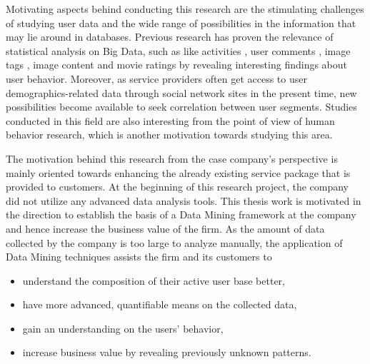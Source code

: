    Motivating aspects behind conducting this research are the stimulating challenges of studying user data and the wide range of possibilities in the information that may lie around in databases. Previous research has proven the relevance of statistical analysis on Big Data, such as like activities \cite{jang2015noreciprocity, jang2016teensengagemorewithfewerphotos, ottoni2013ladies, guy2016whatsyourorganizationlike, jang2015no, youyou2015computer}, user comments \cite{jang2016teensengagemorewithfewerphotos}, image tags \cite{jang2016teensengagemorewithfewerphotos}, image content \cite{hu2014we, bakhshi2014faces} and movie ratings \cite{saraee2004data, kabinsingha2012movie} by revealing interesting findings about user behavior. Moreover, as service providers often get access to user demographics-related data through social network sites in the present time, new possibilities become available to seek correlation between user segments. Studies conducted in this field are also interesting from the point of view of human behavior research, which is another motivation towards studying this area. 

    The motivation behind this research from the case company's perspective is mainly oriented towards enhancing the already existing service package that is provided to customers. At the beginning of this research project, the company did not utilize any advanced data analysis tools. This thesis work is motivated in the direction to establish the basis of a Data Mining framework at the company and hence increase the business value of the firm. As the amount of data collected by the company is too large to analyze manually, the application of Data Mining techniques assists the firm and its customers to 

    \begin{itemize}
        \item understand the composition of their active user base better,
        \item have more advanced, quantifiable means on the collected data,
        \item gain an understanding on the users' behavior, 
        \item increase business value by revealing previously unknown patterns.
    \end{itemize} 

\pagebreak

